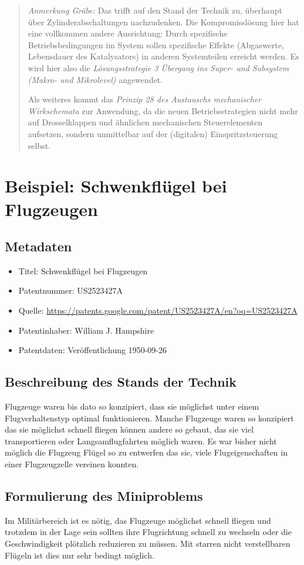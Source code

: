 \documentclass[11pt,a4paper]{article}
\newcommand{\HGG}[1]{\begin{quote} \emph{Anmerkung Gräbe:} #1  \end{quote}}
\begin{document}
\HGG{Das trifft auf den Stand der Technik zu, überhaupt über
  Zylinderabschaltungen nachzudenken.  Die Kompromisslösung hier hat eine
  vollkommen andere Ausrichtung: Durch spezifische Betriebsbedingungen im
  System sollen spezifische Effekte (Abgaswerte, Lebensdauer des Katalysators)
  in anderen Systemteilen erreicht werden. Es wird hier also die
  \emph{Lösungsstrategie 3 Übergang ins Super- und Subsystem (Makro- und
    Mikrolevel)} angewendet. 

  Als weiteres kommt das \emph{Prinzip 28 des Austauschs mechanischer
    Wirkschemata} zur Anwendung, da die neuen Betriebsstrategien nicht mehr
  auf Drosselklappen und ähnlichen mechanischen Steuerelementen aufsetzen,
  sondern unmittelbar auf der (digitalen) Einspritzsteuerung selbst. }

\section{Beispiel: Schwenkflügel bei Flugzeugen}
\subsection{Metadaten}
\begin{itemize}\itemsep0pt
\item Titel: Schwenkflügel bei Flugzeugen
\item Patentnummer: US2523427A
\item Quelle:
  \url{https://patents.google.com/patent/US2523427A/en?oq=US2523427A} 
\item Patentinhaber:  William J. Hampshire
\item Patentdaten: Veröffentlichung 1950-09-26
\end{itemize}

\subsection{Beschreibung des Stands der Technik}
Flugzeuge waren bis dato so konzipiert, dass sie möglichst unter einem
Flugverhaltenstyp optimal funktionieren. Manche Flugzeuge waren so konzipiert
das sie möglichst schnell fliegen können andere so gebaut, das sie viel
transportieren oder Langsamflugfahrten möglich waren. Es war bisher nicht
möglich die Flugzeug Flügel so zu entwerfen das sie, viele Flugeigenschaften
in einer Flugzeugzelle vereinen konnten.
\subsection{Formulierung des Miniproblems}
Im Militärbereich ist es nötig, das Flugzeuge möglichst schnell fliegen und
trotzdem in der Lage sein sollten ihre Flugrichtung schnell zu wechseln oder
die Geschwindigkeit plötzlich reduzieren zu müssen. Mit starren nicht
verstellbaren Flügeln ist dies nur sehr bedingt möglich.
\end{document}
